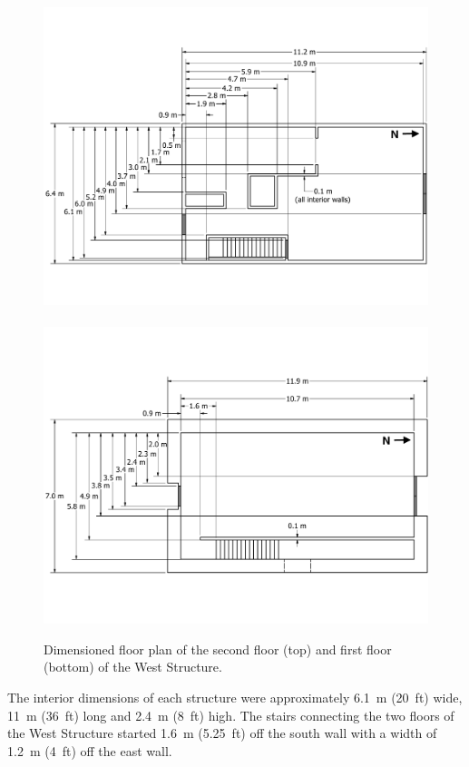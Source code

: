 \documentclass[12pt,oneside]{book}
\begin{document}
\begin{figure}[!ht]
	\includegraphics[width=\columnwidth]{../Figures/Floor_Plans/West_Structure_2nd_Floor_Dimensioned_Full}
	\\~\\
	\includegraphics[width=\columnwidth]{../Figures/Floor_Plans/West_Structure_1st_Floor_Dimensioned_Full}
	\caption[Dimensioned floor plan of the first and second floors of the West Structure.]{Dimensioned floor plan of the second floor (top) and first floor (bottom) of the West Structure.}
	\label{fig:west_dimensioned_plan}
\end{figure}

The interior dimensions of each structure were approximately 6.1~m (20~ft) wide, 11~m (36~ft) long and 2.4~m (8~ft) high. The stairs connecting the two floors of the West Structure started 1.6~m (5.25~ft) off the south wall with a width of 1.2~m (4~ft) off the east wall.
\end{document}
